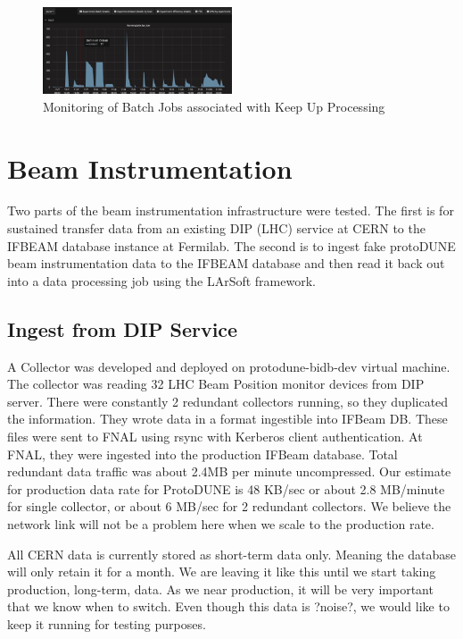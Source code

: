 \documentclass[pdftex,12pt,letter]{article}
\begin{document}
\begin{figure}[tbh]
  \centering
  \includegraphics[width=0.5\textwidth]{./ReportImages/FIFEMonkeepup.jpg}
  \caption{Monitoring of Batch Jobs associated with Keep Up Processing}
  \label{fig:FIFEmon}
\end{figure}



\section {Beam Instrumentation}

Two parts of the beam instrumentation infrastructure were tested. The first is for sustained transfer data from an existing DIP (LHC) service at CERN to the IFBEAM database instance at Fermilab. The second is to ingest fake protoDUNE beam instrumentation data to the IFBEAM database and then read it back out into a data processing job using the LArSoft framework. 


\subsection {Ingest from DIP Service}

A Collector was developed and deployed on protodune-bidb-dev virtual machine. The collector was reading 32 LHC Beam Position monitor devices from DIP server. There were constantly 2 redundant collectors running, so they
duplicated the information. They wrote data in a format ingestible into IFBeam DB. These files were sent to FNAL using rsync with Kerberos client authentication. At FNAL, they were ingested into the production IFBeam
database. Total redundant data traffic was about 2.4MB per minute uncompressed. Our estimate for production data rate for ProtoDUNE is 48 KB/sec or about 2.8 MB/minute for single collector, or about 6 MB/sec for 2 redundant
collectors. We believe the network link will not be a problem here when we scale to the production rate. 

All CERN data is currently stored as short-term data only.   Meaning the database will only retain it for a month.   We are leaving it like this until we start taking production, long-term, data.   As we near production, it will be very important that we know when to switch.  Even though this data is ?noise?, we would like to keep it running for testing purposes.
\end{document}
